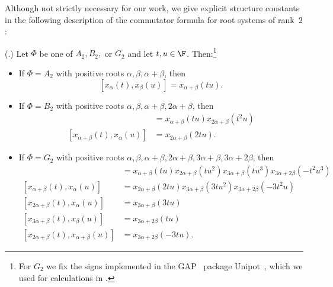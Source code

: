 \documentclass[11pt]{article}
\newcommand{\rnote}[1]{}
\begin{document}
Although  not strictly necessary for our work, we give explicit structure constants in the following description of the commutator formula for root systems of rank~$2$:
\begin{proposition}\label{rk2com}
    \textnormal{(\cite[Sec.~33.3--33.5]{Hum95}.)}
    Let $\Phi$ be one of $A_2,B_2,$ or $G_2$ and let $t,u \in \F$. Then:\footnote{For $G_2$ we fix the signs implemented in the GAP~\cite{GAP4} package Unipot~\cite{HH18}, which we used for calculations in .}
    \begin{itemize}
        \item If $\Phi = A_2$ with positive roots $\alpha,\beta, \alpha+\beta$, then
        \[[x_\alpha(t),x_\beta(u)] = x_{\alpha + \beta}(tu).\]
        \item If $\Phi = B_2$ with positive roots $\alpha,\beta,\alpha+\beta,2\alpha+\beta$, then
        \begin{align*}
        [x_\beta(t),x_\alpha(u)] &= x_{\alpha + \beta}(tu)x_{2\alpha+\beta}(t^2u)\\
        [x_{\alpha+\beta}(t),x_\alpha(u)] &= x_{2\alpha+\beta}(2tu).
        \end{align*}
        \item If $\Phi = G_2$ with positive roots $\alpha,\beta,\alpha+\beta,2\alpha+\beta,3\alpha+\beta,3\alpha+2\beta$, then
        \begin{align*}
        [x_\beta(t),x_\alpha(u)] &= x_{\alpha+\beta}(tu)x_{2\alpha+\beta}(tu^2)x_{3\alpha+\beta}(tu^3)x_{3\alpha+2\beta}(-t^2u^3) \\
        [x_{\alpha+\beta}(t),x_{\alpha}(u)] &= x_{2\alpha+\beta}(2tu)x_{3\alpha+\beta}(3tu^2)x_{3\alpha+2\beta}(-3t^2u)\\
        [x_{2\alpha+\beta}(t),x_{\alpha}(u)] &= x_{3\alpha+\beta}(3tu)\\
        [x_{3\alpha+\beta}(t),x_{\beta}(u)] &= x_{3\alpha+2\beta}(tu) \\
        [x_{2\alpha+\beta}(t),x_{\alpha+\beta}(u)] &= x_{3\alpha+2\beta}(-3tu).
        \end{align*}
        \end{itemize}
\end{proposition}

\end{document}
